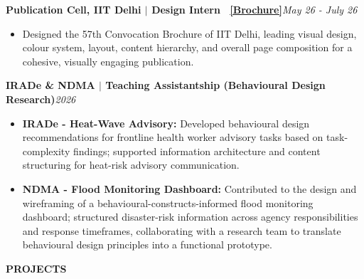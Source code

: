 \documentclass[10pt,a4paper]{article}
\newcommand{\cvsec}[1]{%
  \vspace{6pt}%
  {\color{accent}\large\bfseries\MakeUppercase{#1}}\par
  \vspace{1.5pt}{\color{ink}\hrule height 0.6pt}\vspace{4pt}\par
}
\newcommand{\entry}[2]{{\bfseries #1}\hfill{\itshape #2}\par\vspace{1.5pt}}
\newcommand{\plink}[2]{\href{#1}{\textcolor{accent}{\bfseries [#2]}}}
\begin{document}
\entry{Publication Cell, IIT Delhi  $|$  Design Intern \ \plink{https://convocation.iitd.ac.in/api/uploadsNews/1786106054960-Convocation\%20Brochure\%202026\%20(English).pdf}{Brochure}}{May 26 - July 26}
\begin{itemize}
  \item Designed the 57th Convocation Brochure of IIT Delhi, leading visual design, colour system, layout, content hierarchy, and overall page composition for a cohesive, visually engaging publication.
\end{itemize}
\vspace{4pt}

\entry{IRADe \& NDMA  $|$  Teaching Assistantship (Behavioural Design Research)}{2026}
\begin{itemize}
  \item \textbf{IRADe - Heat-Wave Advisory:} Developed behavioural design recommendations for frontline health worker advisory tasks based on task-complexity findings; supported information architecture and content structuring for heat-risk advisory communication.
  \item \textbf{NDMA - Flood Monitoring Dashboard:} Contributed to the design and wireframing of a behavioural-constructs-informed flood monitoring dashboard; structured disaster-risk information across agency responsibilities and response timeframes, collaborating with a research team to translate behavioural design principles into a functional prototype.
\end{itemize}

\cvsec{Projects}
\end{document}
